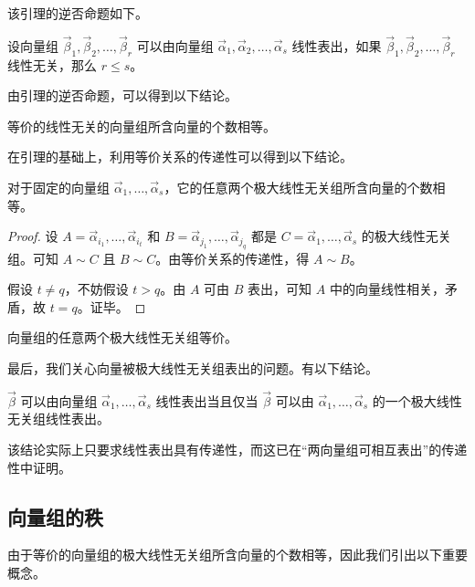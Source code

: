 该引理的逆否命题如下。

\begin{theorem}
	设向量组 $\vec \beta_1, \vec \beta_2, \ldots, \vec \beta_r$ 可以由向量组 $\vec \alpha_1, \vec \alpha_2, \ldots, \vec \alpha_s$ 线性表出，如果 $\vec \beta_1, \vec \beta_2, \ldots, \vec \beta_r$ 线性无关，那么 $r \le s$。
\end{theorem}

由引理的逆否命题，可以得到以下结论。

\begin{theorem}
	等价的线性无关的向量组所含向量的个数相等。
\end{theorem}

在引理的基础上，利用等价关系的传递性可以得到以下结论。

\begin{theorem}
	对于固定的向量组 $\vec \alpha_1, \ldots, \vec \alpha_s$，它的任意两个极大线性无关组所含向量的个数相等。
\end{theorem}

\begin{proof}
	设 $A = \vec \alpha_{i_1}, \ldots, \vec \alpha_{i_t}$ 和 $B = \vec \alpha_{j_1}, \ldots, \vec \alpha_{j_q}$ 都是 $C = \vec \alpha_1, \ldots, \vec \alpha_s$ 的极大线性无关组。可知 $A \sim C$ 且 $B \sim C$。由等价关系的传递性，得 $A \sim B$。

	假设 $t \ne q$，不妨假设 $t > q$。由 $A$ 可由 $B$ 表出，可知 $A$ 中的向量线性相关，矛盾，故 $t = q$。证毕。
\end{proof}

\begin{theorem}
	向量组的任意两个极大线性无关组等价。
\end{theorem}

最后，我们关心向量被极大线性无关组表出的问题。有以下结论。

\begin{theorem}
	$\vec \beta$ 可以由向量组 $\vec \alpha_1, \ldots, \vec \alpha_s$ 线性表出当且仅当 $\vec \beta$ 可以由 $\vec \alpha_1, \ldots, \vec \alpha_s$ 的一个极大线性无关组线性表出。
\end{theorem}

该结论实际上只要求线性表出具有传递性，而这已在“两向量组可相互表出”的传递性中证明。

\subsection{向量组的秩}

由于等价的向量组的极大线性无关组所含向量的个数相等，因此我们引出以下重要概念。

